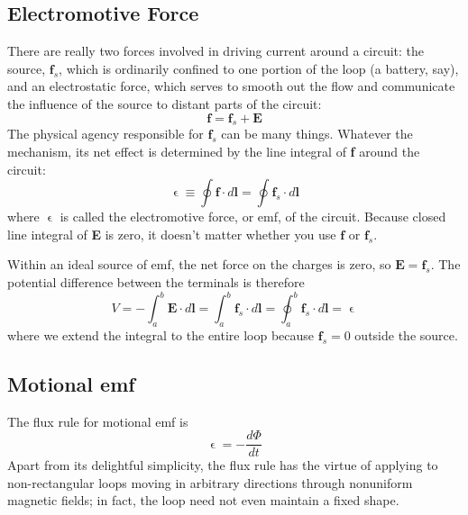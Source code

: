 \documentclass[../../../main.tex]{subfiles}
\begin{document}
\subsection*{Electromotive Force}
There are really two forces involved in driving current around a circuit: the source, $\mathbf{f}_s$, which is ordinarily conﬁned to one portion of the loop (a battery, say), and an electrostatic force, which serves to smooth out the ﬂow and communicate the inﬂuence of the source to distant parts of the circuit:
\begin{equation*}
    \mathbf{f} = \mathbf{f}_s + \mathbf{E}
\end{equation*}
The physical agency responsible for $\mathbf{f}_s$ can be many things. Whatever the mechanism, its net effect is determined by the line integral of \textbf{f} around the circuit:
\begin{equation*}
    \upvarepsilon\equiv \oint\mathbf{f}\cdot d\mathbf{l}=\oint\mathbf{f}_s\cdot d\mathbf{l}
\end{equation*}
where $\upvarepsilon$ is called the electromotive force, or emf, of the circuit. Because closed line integral of \textbf{E} is zero, it doesn't matter whether you use $\mathbf{f}$ or $\mathbf{f}_s$.

Within an ideal source of emf, the net force on the charges is zero, so $\mathbf{E} = \mathbf{f}_s$. The potential difference between the terminals is therefore
\begin{equation*}
    V=-\int_{a}^{b}\mathbf{E}\cdot d\mathbf{l}=\int_{a}^{b}\mathbf{f}_s\cdot d\mathbf{l}= \oint_{a}^{b}\mathbf{f}_s\cdot d\mathbf{l}=\upvarepsilon
\end{equation*}
where we extend the integral to the entire loop because $\mathbf{f}_s = 0 $ outside the source.

\subsection*{Motional emf}
The ﬂux rule for motional emf is 
\begin{equation*}
    \upvarepsilon=-\frac{d\Phi}{dt}
\end{equation*}
Apart from its delightful simplicity, the ﬂux rule has the virtue of applying to non-rectangular loops moving in arbitrary directions through nonuniform magnetic ﬁelds; in fact, the loop need not even maintain a ﬁxed shape.
\end{document}
